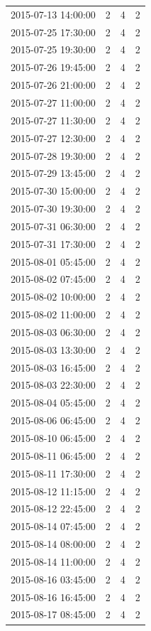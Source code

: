 \begin{tabular}{lrrr}
2015-07-13 14:00:00 & 2 & 4 & 2 \\
2015-07-25 17:30:00 & 2 & 4 & 2 \\
2015-07-25 19:30:00 & 2 & 4 & 2 \\
2015-07-26 19:45:00 & 2 & 4 & 2 \\
2015-07-26 21:00:00 & 2 & 4 & 2 \\
2015-07-27 11:00:00 & 2 & 4 & 2 \\
2015-07-27 11:30:00 & 2 & 4 & 2 \\
2015-07-27 12:30:00 & 2 & 4 & 2 \\
2015-07-28 19:30:00 & 2 & 4 & 2 \\
2015-07-29 13:45:00 & 2 & 4 & 2 \\
2015-07-30 15:00:00 & 2 & 4 & 2 \\
2015-07-30 19:30:00 & 2 & 4 & 2 \\
2015-07-31 06:30:00 & 2 & 4 & 2 \\
2015-07-31 17:30:00 & 2 & 4 & 2 \\
2015-08-01 05:45:00 & 2 & 4 & 2 \\
2015-08-02 07:45:00 & 2 & 4 & 2 \\
2015-08-02 10:00:00 & 2 & 4 & 2 \\
2015-08-02 11:00:00 & 2 & 4 & 2 \\
2015-08-03 06:30:00 & 2 & 4 & 2 \\
2015-08-03 13:30:00 & 2 & 4 & 2 \\
2015-08-03 16:45:00 & 2 & 4 & 2 \\
2015-08-03 22:30:00 & 2 & 4 & 2 \\
2015-08-04 05:45:00 & 2 & 4 & 2 \\
2015-08-06 06:45:00 & 2 & 4 & 2 \\
2015-08-10 06:45:00 & 2 & 4 & 2 \\
2015-08-11 06:45:00 & 2 & 4 & 2 \\
2015-08-11 17:30:00 & 2 & 4 & 2 \\
2015-08-12 11:15:00 & 2 & 4 & 2 \\
2015-08-12 22:45:00 & 2 & 4 & 2 \\
2015-08-14 07:45:00 & 2 & 4 & 2 \\
2015-08-14 08:00:00 & 2 & 4 & 2 \\
2015-08-14 11:00:00 & 2 & 4 & 2 \\
2015-08-16 03:45:00 & 2 & 4 & 2 \\
2015-08-16 16:45:00 & 2 & 4 & 2 \\
2015-08-17 08:45:00 & 2 & 4 & 2 \\

\end{tabular}
